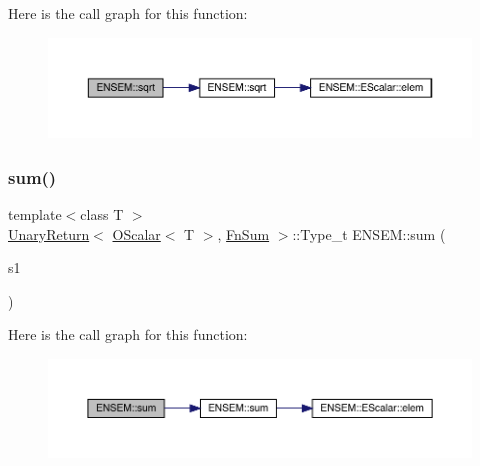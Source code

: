 Here is the call graph for this function\+:\nopagebreak
\begin{figure}[H]
\begin{center}
\leavevmode
\includegraphics[width=350pt]{d1/d71/group__obsscalar_ga8b8e13d0f31d513ae7c36827f65c0c61_cgraph}
\end{center}
\end{figure}
\mbox{\label{group__obsscalar_ga969a0fc381c5a006e976f67c513c4828}} 
\subsubsection{\texorpdfstring{sum()}{sum()}}
{\footnotesize\ttfamily template$<$class T $>$ \\
\mbox{\hyperlink{structENSEM_1_1UnaryReturn}{Unary\+Return}}$<$ \mbox{\hyperlink{classENSEM_1_1OScalar}{O\+Scalar}}$<$ T $>$, \mbox{\hyperlink{structENSEM_1_1FnSum}{Fn\+Sum}} $>$\+::Type\+\_\+t E\+N\+S\+E\+M\+::sum (\begin{DoxyParamCaption}\item[{const \mbox{\hyperlink{classENSEM_1_1OScalar}{O\+Scalar}}$<$ T $>$ \&}]{s1 }\end{DoxyParamCaption})\hspace{0.3cm}{\ttfamily [inline]}}

Here is the call graph for this function\+:\nopagebreak
\begin{figure}[H]
\begin{center}
\leavevmode
\includegraphics[width=350pt]{d1/d71/group__obsscalar_ga969a0fc381c5a006e976f67c513c4828_cgraph}
\end{center}
\end{figure}
\mbox{\label{group__obsscalar_ga9d270814e58292523d977713c693c876}} 
